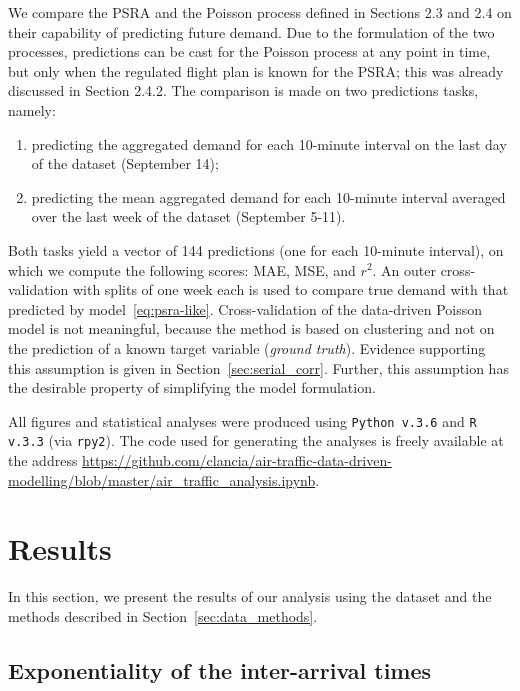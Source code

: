 \documentclass[draft,review]{elsarticle}
\begin{document}
We compare the PSRA and the Poisson process defined in Sections 2.3 and 2.4 on their capability of predicting future demand. Due to the formulation of the two processes, predictions can be cast for the Poisson process at any point in time, but only when the regulated flight plan is known for the PSRA; this was already discussed in Section 2.4.2.
The comparison is made on two predictions tasks, namely:
\begin{enumerate}
  \item predicting the aggregated demand for each 10-minute interval on the last day of the dataset (September 14);
  \item predicting the mean aggregated demand for each 10-minute interval averaged over the last week of the dataset (September 5-11).
\end{enumerate}
Both tasks yield a vector of 144 predictions (one for each 10-minute interval), on which we compute the following scores: \ac{MAE}, \ac{MSE}, and \(r^2\).
An outer cross-validation with splits of one week each is used to compare true demand with that predicted by model~\eqref{eq:psra-like}.
Cross-validation of the data-driven Poisson model is not meaningful, because the method is based on clustering and not on the prediction of a known target variable (\emph{ground truth}).
Evidence supporting this assumption is given in Section~\ref{sec:serial_corr}.
Further, this assumption has the desirable property of simplifying the model formulation.

All figures and statistical analyses were produced using \texttt{Python v.3.6} and \texttt{R v.3.3} (via \texttt{rpy2}). The code used for generating the analyses is freely available at the address \url{https://github.com/clancia/air-traffic-data-driven-modelling/blob/master/air_traffic_analysis.ipynb}.

\section{Results}\label{sec:results}

In this section, we present the results of our analysis using the dataset and the methods described in Section~\ref{sec:data_methods}.

\subsection{Exponentiality of the inter-arrival times}\label{sec:exp}
\end{document}
